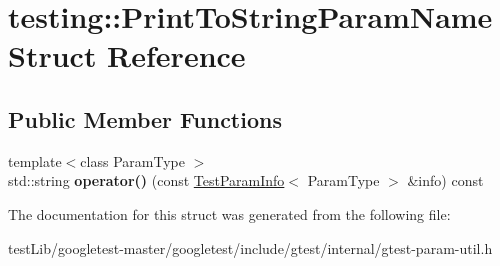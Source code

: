 \hypertarget{structtesting_1_1PrintToStringParamName}{}\section{testing\+:\+:Print\+To\+String\+Param\+Name Struct Reference}
\label{structtesting_1_1PrintToStringParamName}
\subsection*{Public Member Functions}
\begin{DoxyCompactItemize}
\item 
\mbox{\label{structtesting_1_1PrintToStringParamName_a05b411cfb75dadb2c3c0355aee1dcf21}} 
{\footnotesize template$<$class Param\+Type $>$ }\\std\+::string {\bfseries operator()} (const \hyperlink{structtesting_1_1TestParamInfo}{Test\+Param\+Info}$<$ Param\+Type $>$ \&info) const
\end{DoxyCompactItemize}


The documentation for this struct was generated from the following file\+:\begin{DoxyCompactItemize}
\item 
test\+Lib/googletest-\/master/googletest/include/gtest/internal/gtest-\/param-\/util.\+h\end{DoxyCompactItemize}

